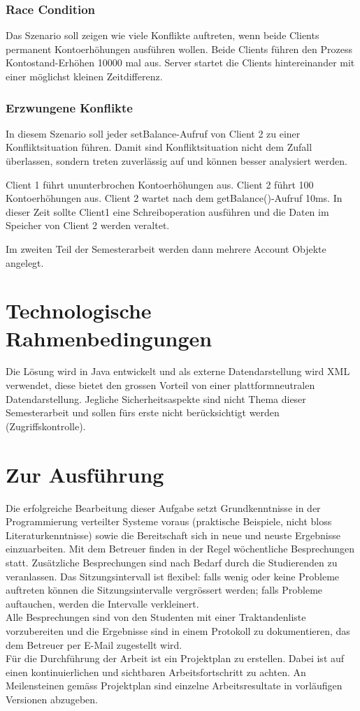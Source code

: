 \documentclass{article}
\begin{document}
\subsubsection{Race Condition}
\label{sec:race-condition}
Das Szenario soll zeigen wie viele Konflikte auftreten, wenn beide Clients permanent Kontoerhöhungen ausführen wollen.
Beide Clients führen den Prozess Kontostand-Erhöhen 10000 mal aus. Server startet die Clients hintereinander mit einer möglichst kleinen Zeitdifferenz.

\subsubsection{Erzwungene Konflikte}
\label{sec:erzwungene-konflikte}

In diesem Szenario soll jeder setBalance-Aufruf von Client 2 zu einer Konfliktsituation führen. Damit sind Konfliktsituation nicht dem Zufall überlassen, sondern treten zuverlässig auf und können besser analysiert werden.

Client 1 führt ununterbrochen Kontoerhöhungen aus. Client 2 führt 100 Kontoerhöhungen aus. Client 2 wartet nach dem getBalance()-Aufruf 10ms. In dieser Zeit sollte Client1 eine Schreiboperation ausführen und die Daten im Speicher von Client 2 werden veraltet.

Im zweiten Teil der Semesterarbeit werden dann mehrere Account Objekte angelegt.



\section{Technologische Rahmenbedingungen}
Die Lösung wird in Java entwickelt und als externe Datendarstellung wird XML verwendet, diese bietet den grossen Vorteil von einer plattformneutralen Datendarstellung. Jegliche Sicherheitsaspekte sind nicht Thema dieser Semesterarbeit und sollen fürs erste nicht berücksichtigt werden (Zugriffskontrolle).

\section{Zur Ausführung}
Die erfolgreiche Bearbeitung dieser Aufgabe setzt Grundkenntnisse in der Programmierung verteilter Systeme voraus (praktische Beispiele, nicht bloss Literaturkenntnisse) sowie die Bereitschaft sich in neue und neuste Ergebnisse einzuarbeiten.
Mit dem Betreuer finden in der Regel wöchentliche Besprechungen statt. Zusätzliche Besprechungen sind nach Bedarf durch die Studierenden zu veranlassen. Das Sitzungsintervall ist flexibel: falls wenig oder keine Probleme auftreten können die Sitzungsintervalle vergrössert werden; falls Probleme auftauchen, werden die Intervalle verkleinert.\\
Alle Besprechungen sind von den Studenten mit einer Traktandenliste vorzubereiten und die Ergebnisse sind in einem Protokoll zu dokumentieren, das dem Betreuer per E-Mail zugestellt wird.\\
Für die Durchführung der Arbeit ist ein Projektplan zu erstellen. Dabei ist auf einen kontinuierlichen und sichtbaren Arbeitsfortschritt zu achten. An Meilensteinen gemäss Projektplan sind einzelne Arbeitsresultate in vorläufigen Versionen abzugeben. 
\end{document}
